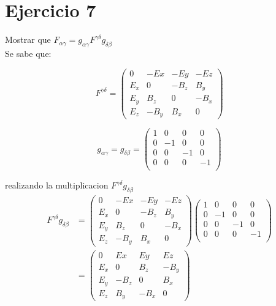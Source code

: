 \section*{Ejercicio 7}
Mostrar que $F_{\alpha\gamma}=g_{\alpha\gamma}F^{\gamma \delta}g_{\delta \beta }$\\
    Se sabe que:\\
    \begin{minipage}{0.5\linewidth}
    \begin{equation*}
        F^{\gamma \delta} = \left( \begin{matrix}
            0 & -Ex & -Ey   & -Ez \\
            E_x &  0  & -B_z & B_y \\
            E_y & B_z & 0 &-B_x \\
            E_z & -B_y & B_x & 0  
        \end{matrix}\right)
    \end{equation*}
\end{minipage}
\begin{minipage}{0.5\linewidth}
\begin{equation*}
    g_{\alpha \gamma} = g_{\delta \beta} =\left(\begin{matrix}
        1 & 0 & 0 & 0\\
        0 & -1 & 0 & 0\\
        0 & 0 & -1 & 0\\
        0 & 0 & 0 & -1\\
    \end{matrix}\right)
\end{equation*}
\end{minipage}
realizando la multiplicacion $F^{\gamma \delta}g_{\delta \beta }$
\begin{align*}
    F^{\gamma \delta}g_{\delta \beta }&= \left( \begin{matrix}
        0 & -Ex & -Ey   & -Ez \\
        E_x &  0  & -B_z & B_y \\
        E_y & B_z & 0 &-B_x \\
        E_z & -B_y & B_x & 0  
    \end{matrix}\right)\left(\begin{matrix}
        1 & 0 & 0 & 0\\
        0 & -1 & 0 & 0\\
        0 & 0 & -1 & 0\\
        0 & 0 & 0 & -1\\
    \end{matrix}\right)\\
    & =\left( \begin{matrix}
        0 & Ex & Ey   & Ez \\
        E_x &  0  & B_z & -B_y \\
        E_y & -B_z & 0 &B_x \\
        E_z & B_y & -B_x & 0  
    \end{matrix}\right)
\end{align*}
